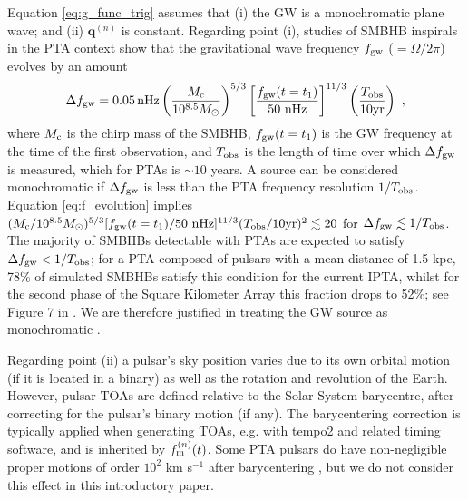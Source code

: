 \documentclass[fleqn,usenatbib,useAMS]{mnras}
\begin{document}
\noindent Equation \eqref{eq:g_func_trig} assumes that (i) the GW is a monochromatic plane wave; and (ii) $\boldsymbol{q}^{(n)}$ is constant. Regarding point (i), studies of SMBHB inspirals in the PTA context show that the gravitational wave frequency $f_{\rm gw}$ ($=\Omega / 2 \pi $) evolves by an amount \citep[e.g.][]{Sesana2010}
\begin{equation}
	\Delta f_{\rm gw} = 0.05 \, \mathrm{nHz}\left(\frac{M_{\rm c}}{10^{8.5} M_{\odot}}\right)^{5 / 3}\left[\frac{f_{\rm gw}(t=t_1)}{50 \mathrm{~nHz}}\right]^{11 / 3}\left(\frac{T_{\mathrm{obs}}}{10 \mathrm{yr}}\right) \ ,
	\label{eq:f_evolution}
\end{equation}
where $M_{\rm c}$ is the chirp mass of the SMBHB, $f_{\rm gw}(t=t_1)$ is the GW frequency at the time of the first observation, and $T_{\rm obs}$ is the length of time over which $\Delta f_{\rm gw}$ is measured, which for PTAs is $\sim 10$ years. A source can be considered monochromatic if $\Delta f_{\rm gw}$ is less than the PTA frequency resolution $1/T_{\rm obs}$. Equation \eqref{eq:f_evolution} implies $(M_{\rm c}/10^{8.5} M_{\odot})^{5/3} [ f_{\rm gw}(t=t_1) / 50 \mathrm{~nHz}]^{11/3} (T_{\rm obs}/10 \mathrm{yr})^2 \lesssim 20$ for $\Delta f_{\rm gw} \lesssim 1/T_{\rm obs}$. The majority of SMBHBs detectable with PTAs are expected to satisfy $\Delta f_{\rm gw} < 1/T_{\rm obs}$; for a PTA composed of pulsars with a mean distance of 1.5 kpc, 78\% of simulated SMBHBs satisfy this condition for the current IPTA, whilst for the second phase of the Square Kilometer Array this fraction drops to 52\%; see Figure 7 in  \cite{Rosado10.1093/mnras/stv1098}. We are therefore justified in treating the GW source as monochromatic \citep{Sesana10,Sesana2010,Ellis2012ApJ}. \newline 


Regarding point (ii) a pulsar's sky position varies due to its own orbital motion (if it is located in a binary) as well as the rotation and revolution of the Earth. However, pulsar TOAs are defined relative to the Solar System barycentre, after correcting for the pulsar's binary motion (if any). The barycentering correction is typically applied when generating TOAs, e.g. with {\sc tempo2} \citep{tempo2,edwardstempo} and related timing software, and is inherited by $f_{\rm m}^{(n)}(t)$. Some PTA pulsars do have non-negligible proper motions of order $10^2$ km s$^{-1}$ after barycentering \citep[e.g.][]{10.1093/mnras/sty3390}, but we do not consider this effect in this introductory paper. 
\end{document}
